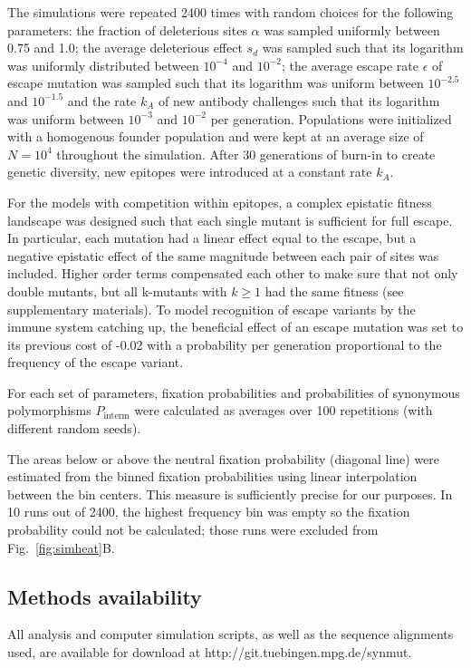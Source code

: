 \documentclass[10pt]{article}
\newcommand{\FIG}[1]{Fig.~\ref{fig:#1}}
\begin{document}
The simulations were repeated 2400 times with random choices for the following
parameters: the fraction of deleterious sites $\alpha$ was sampled uniformly
between 0.75 and 1.0; the average deleterious effect $s_d$ was sampled such that
its logarithm was uniformly distributed  between $10^{-4}$ and $10^{-2}$; the
average escape rate $\epsilon$ of escape mutation was sampled such that its logarithm was
uniform between $10^{-2.5}$ and $10^{-1.5}$ and the rate $k_A$ of new antibody
challenges such that its logarithm was uniform between $10^{-3}$ and $10^{-2}$
per generation. Populations were initialized with a homogenous founder
population and were kept at an average size of $N=10^4$ throughout the
simulation. After 30 generations of burn-in to create genetic diversity, new
epitopes were introduced at a constant rate $k_A$. 

For the models with competition within epitopes, a complex epistatic fitness
landscape was designed such that each single mutant is sufficient for full
escape. In particular, each mutation had a linear effect equal to the escape,
but a negative epistatic effect of the same magnitude between each pair of sites
was included. Higher order terms compensated each other to make sure that not
only double mutants, but all k-mutants with $k \geq 1$ had the same fitness (see
supplementary materials). To model recognition of escape variants by the immune
system  catching up, the beneficial effect of an escape mutation was set
to its previous cost of -0.02 with a probability per generation proportional to
the frequency of the escape variant.

For each set of parameters, fixation probabilities and probabilities of
synonymous polymorphisms $P_\text{interm}$ were calculated as averages over
100 repetitions (with different random seeds).

The areas below or above the neutral fixation probability (diagonal line) were
estimated from the binned fixation probabilities using linear interpolation
between the bin centers. This measure is sufficiently precise for our purposes.
In 10 runs out of 2400, the highest frequency bin was empty so the fixation
probability could not be calculated; those runs were excluded from
\FIG{simheat}B.

\subsection*{Methods availability}
All analysis and computer simulation scripts, as well as the sequence alignments
used, are available for download at http://git.tuebingen.mpg.de/synmut.
\end{document}
